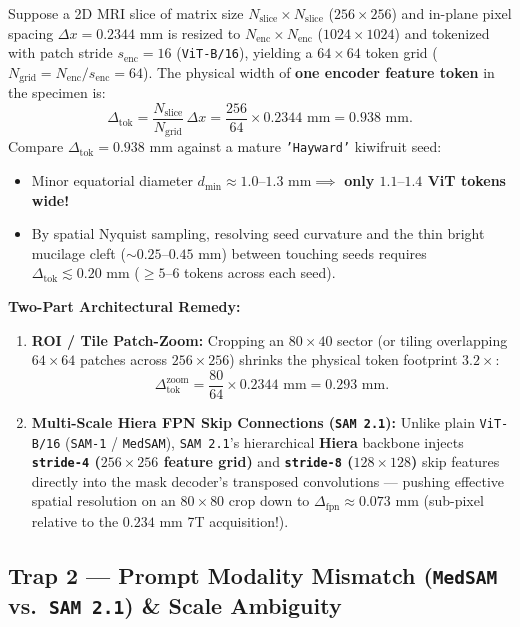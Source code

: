 \documentclass[10.5pt,a4paper]{article}
\begin{document}
Suppose a 2D MRI slice of matrix size $N_{\text{slice}} \times N_{\text{slice}}$ ($256 \times 256$) and in-plane pixel spacing $\Delta x = 0.2344\text{ mm}$ is resized to $N_{\text{enc}} \times N_{\text{enc}}$ ($1024 \times 1024$) and tokenized with patch stride $s_{\text{enc}} = 16$ (\texttt{ViT-B/16}), yielding a $64 \times 64$ token grid ($N_{\text{grid}} = N_{\text{enc}} / s_{\text{enc}} = 64$). The physical width of \textbf{one encoder feature token} in the specimen is:
\[
    \Delta_{\text{tok}} = \frac{N_{\text{slice}}}{N_{\text{grid}}}\,\Delta x = \frac{256}{64} \times 0.2344\text{ mm} = 0.938\text{ mm}.
\]
Compare $\Delta_{\text{tok}} = 0.938\text{ mm}$ against a mature \texttt{'Hayward'} kiwifruit seed:
\begin{itemize}
    \item Minor equatorial diameter $d_{\min} \approx 1.0\text{--}1.3\text{ mm} \implies$ \textbf{only $1.1\text{--}1.4$ ViT tokens wide!}
    \item By spatial Nyquist sampling, resolving seed curvature and the thin bright mucilage cleft ($\sim 0.25\text{--}0.45\text{ mm}$) between touching seeds requires $\Delta_{\text{tok}} \lesssim 0.20\text{ mm}$ ($\ge 5\text{--}6$ tokens across each seed).
\end{itemize}
\textbf{Two-Part Architectural Remedy:}
\begin{enumerate}
    \item \textbf{ROI / Tile Patch-Zoom:} Cropping an $80 \times 40$ sector (or tiling overlapping $64 \times 64$ patches across $256 \times 256$) shrinks the physical token footprint $3.2\times$:
    \[
        \Delta_{\text{tok}}^{\text{zoom}} = \frac{80}{64} \times 0.2344\text{ mm} = 0.293\text{ mm}.
    \]
    \item \textbf{Multi-Scale Hiera FPN Skip Connections (\texttt{SAM 2.1}):} Unlike plain \texttt{ViT-B/16} (\texttt{SAM-1} / \texttt{MedSAM}), \texttt{SAM 2.1}'s hierarchical \textbf{Hiera} backbone injects \textbf{\texttt{stride-4} ($256 \times 256$ feature grid)} and \textbf{\texttt{stride-8} ($128 \times 128$)} skip features directly into the mask decoder's transposed convolutions --- pushing effective spatial resolution on an $80 \times 80$ crop down to $\Delta_{\text{fpn}} \approx 0.073\text{ mm}$ (sub-pixel relative to the $0.234\text{ mm}$ 7T acquisition!).
\end{enumerate}

\subsection{Trap 2 --- Prompt Modality Mismatch (\texttt{MedSAM} vs.\ \texttt{SAM 2.1}) \& Scale Ambiguity}
\end{document}

